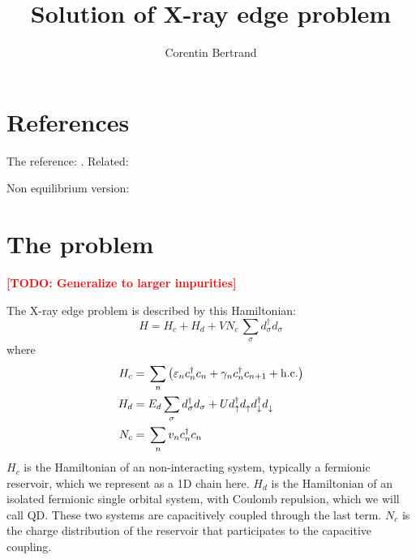 \documentclass[12pt]{article}
\newcommand\TODO[1]{\textcolor{red}{\textbf{[TODO: #1]}}}
\newcommand\up{\uparrow}
\newcommand\dn{\downarrow}
\newcommand\nodag{{\vphantom{\dagger}}}
\begin{document}
\title{Solution of X-ray edge problem}
\author{Corentin Bertrand}

\maketitle




\begin{acronym}
\end{acronym}

\section{References}

The reference: \cite{NozieresDeDominicis1969}. Related: \cite{Roulet1969, NozieresRoulet1969}

Non equilibrium version: \cite{Aleiner1997}

\section{The problem}

\TODO{Generalize to larger impurities}

The X-ray edge problem is described by this Hamiltonian:
\begin{equation}
	H = H_c + H_d + V N_c \, \sum_{\sigma} d_\sigma^\dagger d_\sigma
\end{equation}
where
\begin{align}
	H_c ={}& \sum_n \qty( \varepsilon_n c_n^\dagger c_n + \gamma_n c_n^\dagger c_{n+1} + \text{h.c.})
	\\
	H_d ={}& E_d \sum_{\sigma} d_\sigma^\dagger d_\sigma + U d_\up^\dag d_\up^\nodag d_\dn^\dag d_\dn^\nodag
	\\
	N_c ={}& \sum_n v_n c_n^\dag c_n
\end{align}
$H_c$ is the Hamiltonian of an non-interacting system, typically a fermionic reservoir, which we represent as a 1D chain here. $H_d$ is the Hamiltonian of an isolated fermionic single orbital system, with Coulomb repulsion, which we will call \ac{QD}. These two systems are capacitively coupled through the last term. $N_c$ is the charge distribution of the reservoir that participates to the capacitive coupling.
\end{document}
